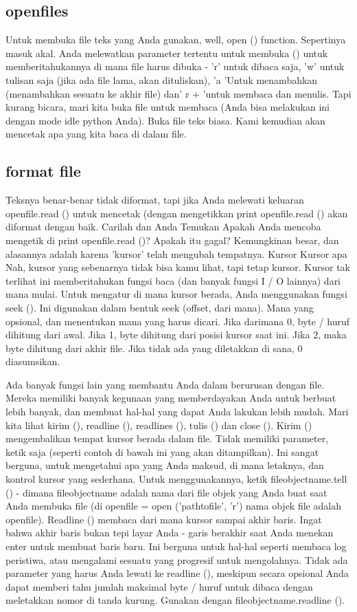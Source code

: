 \subsection{openfiles}
Untuk membuka file teks yang Anda gunakan, well, open () function. Sepertinya masuk akal. Anda melewatkan parameter tertentu untuk membuka () untuk memberitahukannya di mana file harus dibuka - 'r' untuk dibaca saja, 'w' untuk tulisan saja (jika ada file lama, akan dituliskan), 'a 'Untuk menambahkan (menambahkan sesuatu ke akhir file) dan' r + 'untuk membaca dan menulis. Tapi kurang bicara, mari kita buka file untuk membaca (Anda bisa melakukan ini dengan mode idle python Anda). Buka file teks biasa. Kami kemudian akan mencetak apa yang kita baca di dalam file.

\subsection{format file}
Teksnya benar-benar tidak diformat, tapi jika Anda melewati keluaran openfile.read () untuk mencetak (dengan mengetikkan print openfile.read () akan diformat dengan baik. Carilah dan Anda Temukan Apakah Anda mencoba mengetik di print openfile.read ()? Apakah itu gagal? Kemungkinan besar, dan alasannya adalah karena 'kursor' telah mengubah tempatnya. Kursor Kursor apa Nah, kursor yang sebenarnya tidak bisa kamu lihat, tapi tetap kursor. Kursor tak terlihat ini memberitahukan fungsi baca (dan banyak fungsi I / O lainnya) dari mana mulai. Untuk mengatur di mana kursor berada, Anda menggunakan fungsi seek (). Ini digunakan dalam bentuk seek (offset, dari mana). Mana yang opsional, dan menentukan mana yang harus dicari. Jika darimana 0, byte / huruf dihitung dari awal. Jika 1, byte dihitung dari posisi kursor saat ini. Jika 2, maka byte dihitung dari akhir file. Jika tidak ada yang diletakkan di sana, 0 diasumsikan. 

Ada banyak fungsi lain yang membantu Anda dalam berurusan dengan file. Mereka memiliki banyak kegunaan yang memberdayakan Anda untuk berbuat lebih banyak, dan membuat hal-hal yang dapat Anda lakukan lebih mudah. Mari kita lihat kirim (), readline (), readlines (), tulis () dan close (). Kirim () mengembalikan tempat kursor berada dalam file. Tidak memiliki parameter, ketik saja (seperti contoh di bawah ini yang akan ditampilkan). Ini sangat berguna, untuk mengetahui apa yang Anda maksud, di mana letaknya, dan kontrol kursor yang sederhana. Untuk menggunakannya, ketik fileobjectname.tell () - dimana fileobjectname adalah nama dari file objek yang Anda buat saat Anda membuka file (di openfile = open ('pathtofile', 'r') nama objek file adalah openfile). Readline () membaca dari mana kursor sampai akhir baris. Ingat bahwa akhir baris bukan tepi layar Anda - garis berakhir saat Anda menekan enter untuk membuat baris baru. Ini berguna untuk hal-hal seperti membaca log peristiwa, atau mengalami sesuatu yang progresif untuk mengolahnya. Tidak ada parameter yang harus Anda lewati ke readline (), meskipun secara opsional Anda dapat memberi tahu jumlah maksimal byte / huruf untuk dibaca dengan meletakkan nomor di tanda kurung. Gunakan dengan fileobjectname.readline (). 

